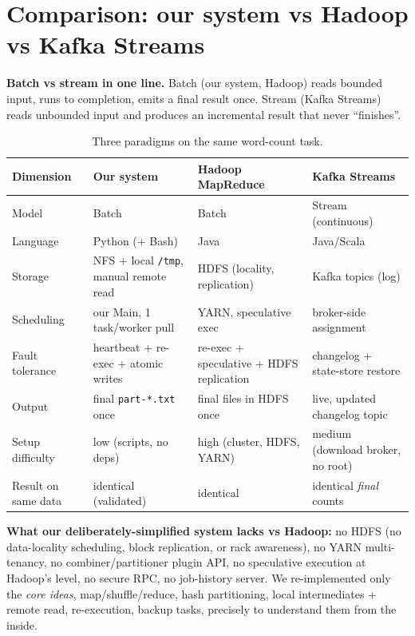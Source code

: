 \documentclass[11pt,a4paper]{article}
\newcommand{\code}[1]{\texttt{\small #1}}
\begin{document}
\section{Comparison: our system vs Hadoop vs Kafka Streams}\label{sec:compare}

\textbf{Batch vs stream in one line.} Batch (our system, Hadoop) reads bounded
input, runs to completion, emits a final result once. Stream (Kafka Streams)
reads unbounded input and produces an incremental result that never ``finishes''.

\begin{table}[H]
\centering
\small
\renewcommand{\arraystretch}{1.3}
\begin{tabularx}{\textwidth}{@{}lXXX@{}}
\toprule
\textbf{Dimension} & \textbf{Our system} & \textbf{Hadoop MapReduce} & \textbf{Kafka Streams}\\
\midrule
Model & Batch & Batch & Stream (continuous)\\
Language & Python (+ Bash) & Java & Java/Scala\\
Storage & NFS + local \code{/tmp}, manual remote read & HDFS (locality, replication) & Kafka topics (log)\\
Scheduling & our Main, 1 task/worker pull & YARN, speculative exec & broker-side assignment\\
Fault tolerance & heartbeat + re-exec + atomic writes & re-exec + speculative + HDFS replication & changelog + state-store restore\\
Output & final \code{part-*.txt} once & final files in HDFS once & live, updated changelog topic\\
Setup difficulty & low (scripts, no deps) & high (cluster, HDFS, YARN) & medium (download broker, no root)\\
Result on same data & identical (validated) & identical & identical \emph{final} counts\\
\bottomrule
\end{tabularx}
\caption{Three paradigms on the same word-count task.}
\end{table}

\textbf{What our deliberately-simplified system lacks vs Hadoop:} no HDFS (no
data-locality scheduling, block replication, or rack awareness), no YARN
multi-tenancy, no combiner/partitioner plugin API, no speculative execution at
Hadoop's level, no secure RPC, no job-history server. We re-implemented only the
\emph{core ideas}, map/shuffle/reduce, hash partitioning, local intermediates +
remote read, re-execution, backup tasks, precisely to understand them from the
inside.
\end{document}
